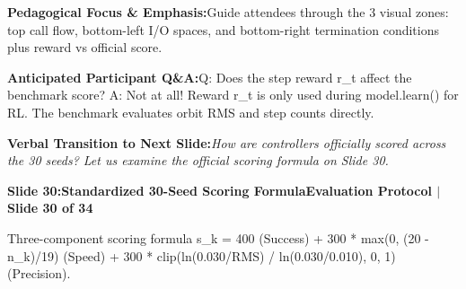 \documentclass[11pt,a4paper]{article}
\begin{document}
\begin{tcolorbox}[colback=lightbg,colframe=bordergray,left=6pt,right=6pt,top=3pt,bottom=3pt,boxrule=0.6pt,arc=2.5pt]
\small
\noindent\textbf{\color{navy}Pedagogical Focus \& Emphasis:}\enspace Guide attendees through the 3 visual zones: top call flow, bottom-left I/O spaces, and bottom-right termination conditions plus reward vs official score.\par\vspace{0.3em}
\noindent\textbf{\color{successgreen}Anticipated Participant Q\&A:}\enspace Q: Does the step reward r\_t affect the benchmark score? A: Not at all! Reward r\_t is only used during model.learn() for RL. The benchmark evaluates orbit RMS and step counts directly.\par\vspace{0.3em}
\noindent\textbf{\color{accent}Verbal Transition to Next Slide:}\enspace \emph{How are controllers officially scored across the 30 seeds? Let us examine the official scoring formula on Slide 30.}
\end{tcolorbox}
\clearpage
\hypertarget{slide.30}{}
{}
\noindent\begin{tcolorbox}[colback=navy,colframe=navy,left=6pt,right=6pt,top=3pt,bottom=3pt,boxrule=0pt,arc=2pt]
{\large\bfseries\color{white}Slide 30:\enspace Standardized 30-Seed Scoring Formula}\hfill{\footnotesize\bfseries\color{white!85!lightbg}Evaluation Protocol \enspace$|$\enspace Slide 30 of 34}
\end{tcolorbox}
\vspace{0.2em}
\begin{tcolorbox}[colback=lightbg,colframe=bordergray,title={\footnotesize\bfseries\color{darkgray}Slide Visual Blueprint},fontupper=\small,left=6pt,right=6pt,top=2.5pt,bottom=2.5pt,boxrule=0.6pt,arc=2.5pt]
Three-component scoring formula s\_k = 400 (Success) + 300 * max(0, (20 - n\_k)/19) (Speed) + 300 * clip(ln(0.030/RMS) / ln(0.030/0.010), 0, 1) (Precision).
\end{tcolorbox}
\vspace{0.2em}
\end{document}
